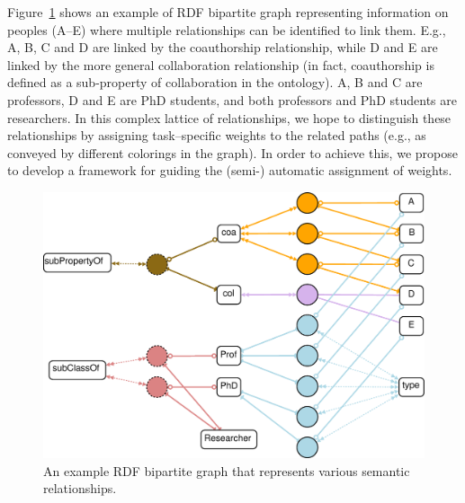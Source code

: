 \begin{myexp}
Figure~\ref{fig:hypergraph_mining-comp} shows an example of RDF bipartite graph representing information on peoples (A--E) where multiple relationships can be identified to link them. E.g., A, B, C and D are linked by the coauthorship relationship, while D and E are linked by the more general collaboration relationship (in fact, coauthorship is defined as a sub-property of collaboration in the ontology). A, B and C are professors, D and E are PhD students, and both professors and PhD students are researchers. In this complex lattice of relationships, we hope to distinguish these relationships by assigning task--specific weights to the related paths (e.g., as conveyed by different colorings in the graph). In order to achieve this, we propose to develop a framework for guiding the (semi-) automatic assignment of weights.
\end{myexp}

\begin{figure}[tbh]
\begin{center}
\includegraphics[width=.65\textwidth]{fig/hypergraph_mining-comp.eps}
\end{center}
\caption[An example RDF bipartite graph that represents various semantic relationships]{\label{fig:hypergraph_mining-comp} An example RDF bipartite graph that represents various semantic relationships.}
\end{figure}
